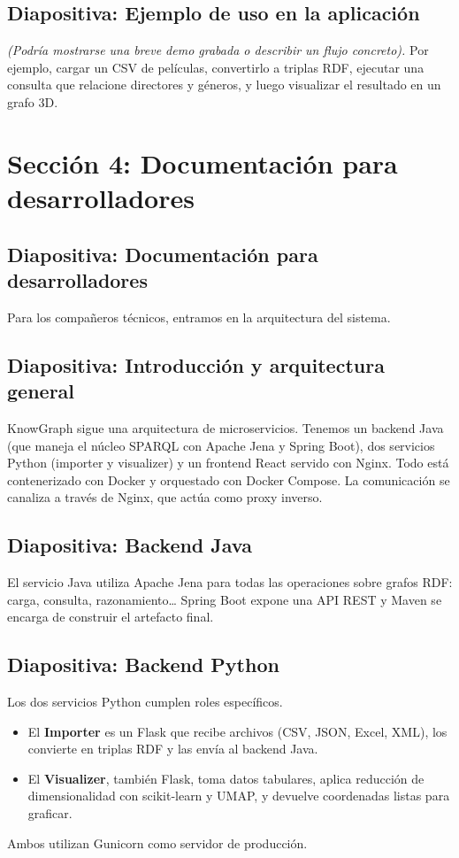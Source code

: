 \documentclass{article}
\begin{document}
\subsection*{Diapositiva: Ejemplo de uso en la aplicación}
\textit{(Podría mostrarse una breve demo grabada o describir un flujo concreto).} Por ejemplo, cargar un CSV de películas, convertirlo a triplas RDF, ejecutar una consulta que relacione directores y géneros, y luego visualizar el resultado en un grafo 3D.

\section*{Sección 4: Documentación para desarrolladores}

\subsection*{Diapositiva: Documentación para desarrolladores}
Para los compañeros técnicos, entramos en la arquitectura del sistema.

\subsection*{Diapositiva: Introducción y arquitectura general}
KnowGraph sigue una arquitectura de microservicios. Tenemos un backend Java (que maneja el núcleo SPARQL con Apache Jena y Spring Boot), dos servicios Python (importer y visualizer) y un frontend React servido con Nginx. Todo está contenerizado con Docker y orquestado con Docker Compose. La comunicación se canaliza a través de Nginx, que actúa como proxy inverso.

\subsection*{Diapositiva: Backend Java}
El servicio Java utiliza Apache Jena para todas las operaciones sobre grafos RDF: carga, consulta, razonamiento… Spring Boot expone una API REST y Maven se encarga de construir el artefacto final.

\subsection*{Diapositiva: Backend Python}
Los dos servicios Python cumplen roles específicos.
\begin{itemize}
    \item El \textbf{Importer} es un Flask que recibe archivos (CSV, JSON, Excel, XML), los convierte en triplas RDF y las envía al backend Java.
    \item El \textbf{Visualizer}, también Flask, toma datos tabulares, aplica reducción de dimensionalidad con scikit‑learn y UMAP, y devuelve coordenadas listas para graficar.
\end{itemize}
Ambos utilizan Gunicorn como servidor de producción.
\end{document}
